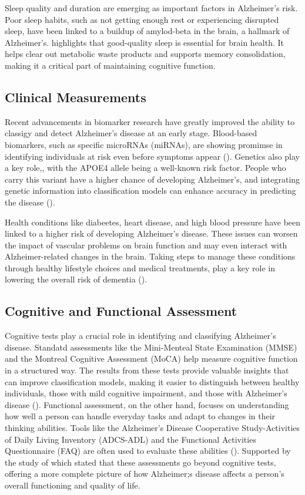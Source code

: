 \documentclass[12pt]{article}
\begin{document}
Sleep quality and duration are emerging as important factors in Alzheimer's risk. Poor sleep habits, such as not getting enough rest or experiencing disrupted sleep, have been linked to a buildup of amylod-beta in the brain, a hallmark of Alzheimer's. \cite{Dominguez2021} highlights
that good-quality sleep is essential for brain health. It helps clear out metabolic waste products and supports memory consolidation, making it a critical part of maintaining cognitive function.

\subsection{Clinical Measurements}
\noindent

Recent advancements in biomarker research have greatly improved the ability to classigy and detect Alzheimer's disease at an early stage. Blood-based biomarkers, such as specific microRNAs (miRNAs), are showing promimse in identifying individuals at risk even before symptoms appear 
(\cite{JAMA2019}). Genetics also play a key role,, with the APOE4 allele being a well-known risk factor. People who carry this variant have a higher chance of developing Alzheimer's, and integrating genetic information into classification models can enhance accuracy in predicting the
disease (\cite{JAMA2019}).

Health conditions like diabeetes, heart disease, and high blood pressure have been linked to a higher risk of developing Alzheimer's disease. These issues can worsen the impact of vascular problems on brain function and may even interact with Alzheimer-related changes in the brain. Taking
steps to manage these conditions through healthy lifestyle choices and medical treatments, play a key role in lowering the overall risk of dementia (\cite{PMC2021}).

\subsection{Cognitive and Functional Assessment}
\noindent

Cognitive tests play a crucial role in identifying and classifying Alzheimer's disease. Standatd assessments like the Mini-Menteal State Examination (MMSE) and the Montreal Cognitive Assessment (MoCA) help measure cognitive function in a structured way. The results from these tests provide 
valuable insights that can improve classification models, making it easier to distinguish between healthy individuals, those with mild cognitive impairment, and those with Alzheimer's disease (\cite{PMC2021}). Functional assessment, on the other hand, focuses on understanding how well a person
can handle everyday tasks and adapt to changes in their thinking abilities. Tools like the Alzheimer's Disease Cooperative Study-Activities of Daily Living Inventory (ADCS-ADL) and the Functional Activities Questionnaire (FAQ) are often used to evaluate these abilities (\cite{Custodio2022}). Supported by
the study of \cite{Cummings2017} which stated that these assessments go beyond cognitive tests, offering a more complete picture of how Alzheimer;s disease affects a person's overall functioning and quality of life.
\end{document}
